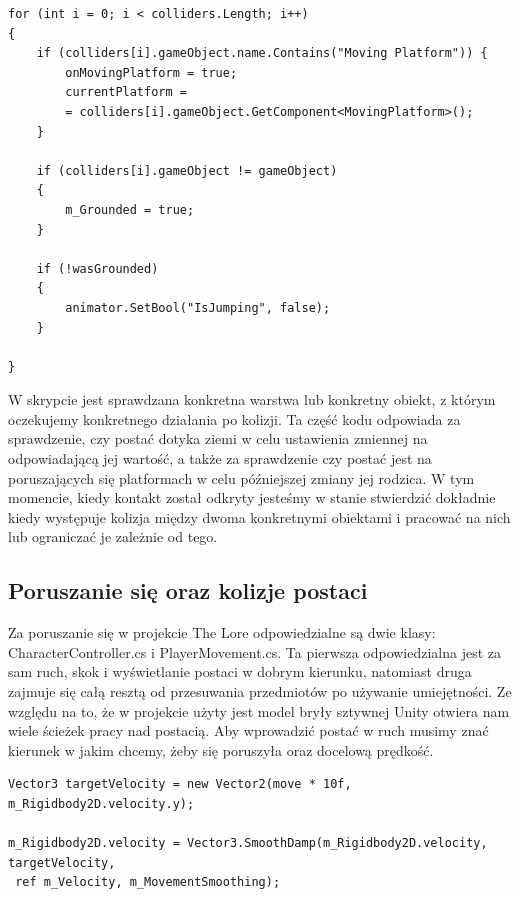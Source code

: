 \documentclass[oneside,polski,logo]{amuthesis}
\begin{document}
\begin{lstlisting}[breaklines=true,
language={[Sharp]C},
rulecolor=\color{blue!80!black},
caption={Fragment klasy \texttt{CharacterController.cs}}
]
for (int i = 0; i < colliders.Length; i++)
{
	if (colliders[i].gameObject.name.Contains("Moving Platform")) {
		onMovingPlatform = true;
		currentPlatform = 
		= colliders[i].gameObject.GetComponent<MovingPlatform>();
	}

	if (colliders[i].gameObject != gameObject)
	{
		m_Grounded = true;
	}

	if (!wasGrounded)
	{
		animator.SetBool("IsJumping", false);
	}

}
\end{lstlisting}

W skrypcie jest sprawdzana konkretna warstwa lub konkretny obiekt, z którym oczekujemy konkretnego działania po kolizji.
Ta część kodu odpowiada za sprawdzenie, czy postać dotyka ziemi w celu ustawienia zmiennej na odpowiadającą jej wartość, a także za sprawdzenie czy postać jest na poruszających się platformach w celu późniejszej zmiany jej rodzica.
W tym momencie, kiedy kontakt został odkryty jesteśmy w stanie stwierdzić dokładnie kiedy występuje kolizja między dwoma konkretnymi obiektami i pracować na nich lub ograniczać je zależnie od tego.
\subsection{Poruszanie się oraz kolizje postaci}
Za poruszanie się w projekcie The Lore odpowiedzialne są dwie klasy: CharacterController.cs i PlayerMovement.cs. Ta pierwsza odpowiedzialna jest za sam ruch, skok i wyświetlanie postaci w dobrym kierunku, natomiast druga zajmuje się całą resztą od przesuwania przedmiotów po używanie umiejętności. Ze względu na to, że w projekcie użyty jest model bryły sztywnej Unity otwiera nam wiele ścieżek pracy nad postacią. Aby wprowadzić postać w ruch musimy znać kierunek w jakim chcemy, żeby się poruszyła oraz docelową prędkość.

\begin{lstlisting}[breaklines=true,
language={[Sharp]C},
rulecolor=\color{blue!80!black},
caption={Fragment klasy \texttt{CharacterController.cs}}
]
Vector3 targetVelocity = new Vector2(move * 10f, m_Rigidbody2D.velocity.y);

m_Rigidbody2D.velocity = Vector3.SmoothDamp(m_Rigidbody2D.velocity, targetVelocity,
 ref m_Velocity, m_MovementSmoothing);
\end{lstlisting}
\end{document}
